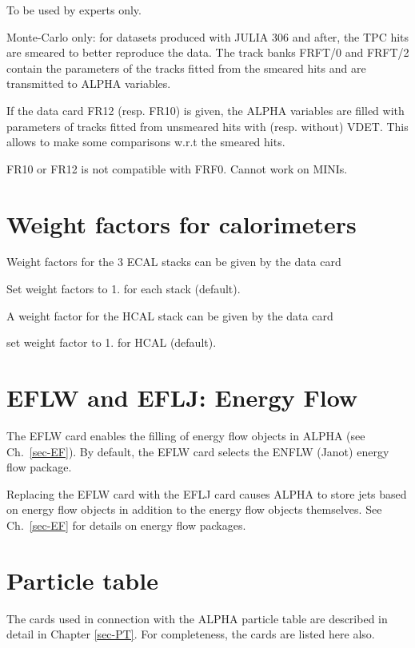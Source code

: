 To be used by experts only.

Monte-Carlo only: for datasets produced with JULIA 306 and after, the TPC hits are smeared to
better reproduce the data. The track banks FRFT/0 and  FRFT/2  contain the parameters of the tracks fitted from the
smeared hits and are transmitted to ALPHA variables.

If the data card FR12 (resp. FR10) is given, the ALPHA variables are filled with  parameters of tracks fitted from
unsmeared hits  with (resp. without) VDET.  This allows to make some comparisons w.r.t the smeared hits.

FR10 or FR12 is not compatible with FRF0. Cannot work on MINIs.

\par
\section{\label{sec-DCWF}Weight factors for calorimeters}
\par
\par Weight factors
for the 3 ECAL stacks can be given by the data card
\begin{indentlist}{ 2.50cm}{ 2.75cm}
Set weight factors to 1. for each stack
(default).\end{indentlist}
\par A weight factor for
the HCAL stack can be given by the data card
\begin{indentlist}{ 2.50cm}{ 2.75cm}
set weight factor to 1. for HCAL (default).
\end{indentlist}
\section{\label{sec-DCEFLW}EFLW and EFLJ: Energy Flow}
\par
The EFLW card enables the filling of energy flow objects in ALPHA
(see Ch.~\ref{sec-EF}).
By default, the EFLW card selects the ENFLW (Janot) energy flow package.
 
Replacing the EFLW card with the EFLJ card
causes ALPHA to store jets based on energy flow objects in
addition to the energy flow objects themselves. See Ch.~\ref{sec-EF} for details on energy flow packages.
\par
\section{\label{sec-DCPT}Particle table}
\par
\par The cards used in connection with the ALPHA particle table are
described in
detail in Chapter \ref{sec-PT}. For completeness,
the cards are listed here also.
